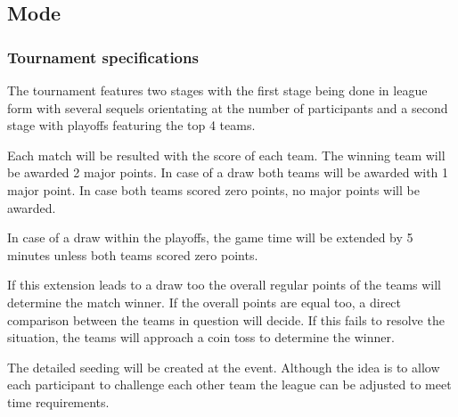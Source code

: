 \documentclass[12pt,twoside]{article}
\begin{document}
\subsection{Mode}
\subsubsection{Tournament specifications}

The tournament features two stages with the first stage being done in
league form with several sequels orientating at the number of
participants and a second stage with playoffs featuring the top 4
teams.

Each match will be resulted with the score of each team. The winning
team will be awarded 2 major points. In case of a draw both teams will
be awarded with 1 major point. In case both teams scored zero points,
no major points will be awarded.

In case of a draw within the playoffs, the game time will be extended
by 5 minutes unless both teams scored zero points.

If this extension leads to a draw too the overall regular points of
the teams will determine the match winner. If the overall points are
equal too, a direct comparison between the teams in question will
decide. If this fails to resolve the situation, the teams will
approach a coin toss to determine the winner.

The detailed seeding will be created at the event. Although the idea
is to allow each participant to challenge each other team the league
can be adjusted to meet time requirements.
\end{document}

